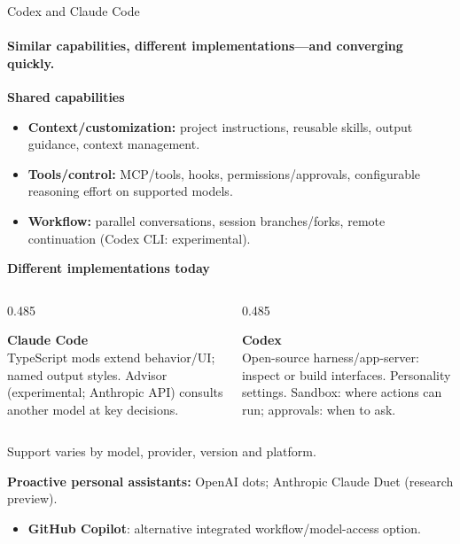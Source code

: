 \documentclass[11pt,aspectratio=169]{beamer}
\begin{document}
\begin{frame}{Codex and Claude Code}
\framesubtitle{\small Similar capabilities, different implementations---and converging quickly.}
\footnotesize
\textbf{Shared capabilities}
\begin{itemize}\setlength{\itemsep}{1pt}
    \item \textbf{Context/customization:} project instructions, reusable skills, output guidance, context management.
    \item \textbf{Tools/control:} MCP/tools, hooks, permissions/approvals, configurable reasoning effort on supported models.
    \item \textbf{Workflow:} parallel conversations, session branches/forks, remote continuation (Codex CLI: experimental).
\end{itemize}

\vspace{0.1cm}
\textbf{Different implementations today}
\begin{columns}[T,onlytextwidth]
\begin{column}[T]{0.485\textwidth}
\raggedright
\textbf{Claude Code}\\
TypeScript mods extend behavior/UI; named output styles. Advisor (experimental; Anthropic API) consults another model at key decisions.
\end{column}
\begin{column}[T]{0.485\textwidth}
\raggedright
\textbf{Codex}\\
Open-source harness/app-server: inspect or build interfaces. Personality settings. Sandbox: where actions can run; approvals: when to ask.
\end{column}
\end{columns}

\vspace{0.1cm}
{\scriptsize Support varies by model, provider, version and platform.}

\vspace{0.35cm}
\textbf{Proactive personal assistants:} OpenAI dots; Anthropic Claude Duet (research preview).
\begin{itemize}\setlength{\itemsep}{0pt}
    \item \footnotesize \textbf{GitHub Copilot}: alternative integrated workflow/model-access option.
\end{itemize}
\end{frame}
\end{document}
